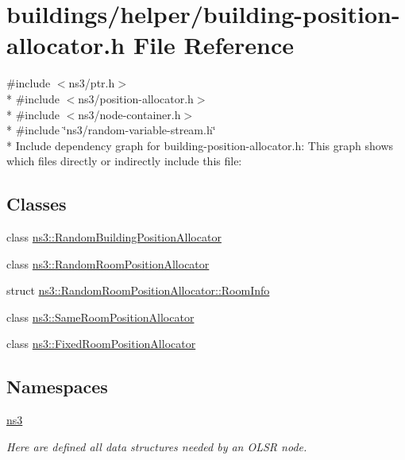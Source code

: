 \hypertarget{building-position-allocator_8h}{}\section{buildings/helper/building-\/position-\/allocator.h File Reference}
\label{building-position-allocator_8h}
{\ttfamily \#include $<$ns3/ptr.\+h$>$}\\*
{\ttfamily \#include $<$ns3/position-\/allocator.\+h$>$}\\*
{\ttfamily \#include $<$ns3/node-\/container.\+h$>$}\\*
{\ttfamily \#include \char`\"{}ns3/random-\/variable-\/stream.\+h\char`\"{}}\\*
Include dependency graph for building-\/position-\/allocator.h\+:
This graph shows which files directly or indirectly include this file\+:
\subsection*{Classes}
\begin{DoxyCompactItemize}
\item 
class \hyperlink{classns3_1_1RandomBuildingPositionAllocator}{ns3\+::\+Random\+Building\+Position\+Allocator}
\item 
class \hyperlink{classns3_1_1RandomRoomPositionAllocator}{ns3\+::\+Random\+Room\+Position\+Allocator}
\item 
struct \hyperlink{structns3_1_1RandomRoomPositionAllocator_1_1RoomInfo}{ns3\+::\+Random\+Room\+Position\+Allocator\+::\+Room\+Info}
\item 
class \hyperlink{classns3_1_1SameRoomPositionAllocator}{ns3\+::\+Same\+Room\+Position\+Allocator}
\item 
class \hyperlink{classns3_1_1FixedRoomPositionAllocator}{ns3\+::\+Fixed\+Room\+Position\+Allocator}
\end{DoxyCompactItemize}
\subsection*{Namespaces}
\begin{DoxyCompactItemize}
\item 
 \hyperlink{namespacens3}{ns3}
\begin{DoxyCompactList}\small\item\em Here are defined all data structures needed by an O\+L\+SR node. \end{DoxyCompactList}\end{DoxyCompactItemize}
